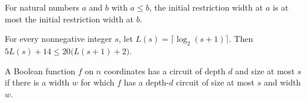 \begin{theorem}
\label{FABL.DepthCircuit.initialRestrictionWidth_mono}
\leanok
{}
For natural numbers $a$ and $b$ with $a \le b$, the initial restriction width at $a$ is
at most the initial restriction width at $b$.
\end{theorem}

\begin{theorem}
\label{FABL.DepthCircuit.initialRestrictionWidth_le_step_succ}
\leanok
{}
For every nonnegative integer $s$, let $L(s)=\lceil\log_2(s+1)\rceil$. Then
$5L(s)+14\leq 20\bigl(L(s+1)+2\bigr)$.
\end{theorem}

\begin{definition}
\label{FABL.DepthCircuit.HasDepthSizeCircuit}
\leanok
{}
A Boolean function $f$ on $n$ coordinates has a circuit of depth $d$ and size at most
$s$ if there is a width $w$ for which $f$ has a depth-$d$ circuit of size at most $s$
and width $w$.
\end{definition}

